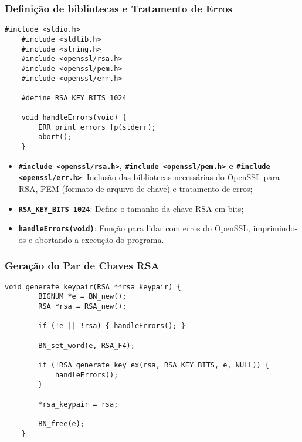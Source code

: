 \documentclass[a4paper,12pt]{article}
\begin{document}
\subsubsection*{Definição de bibliotecas e Tratamento de Erros}
\begin{lstlisting}[style=CStyle]
    #include <stdio.h>
    #include <stdlib.h>
    #include <string.h>
    #include <openssl/rsa.h>
    #include <openssl/pem.h>
    #include <openssl/err.h>

    #define RSA_KEY_BITS 1024

    void handleErrors(void) {
        ERR_print_errors_fp(stderr);
        abort();
    }
\end{lstlisting}

\begin{itemize}
    \item \textbf{\lstinline[style=CStyle]{#include <openssl/rsa.h>}, \lstinline[style=CStyle]{#include <openssl/pem.h>} e \lstinline[style=CStyle]{#include <openssl/err.h>}}: Inclusão das bibliotecas necessárias do OpenSSL para RSA, PEM (formato de arquivo de chave) e tratamento de erros;
    \item \textbf{\lstinline[style=CStyle]{RSA_KEY_BITS 1024}}: Define o tamanho da chave RSA em bits;
    \item \textbf{\lstinline[style=CStyle]{handleErrors(void)}}: Função para lidar com erros do OpenSSL, imprimindo-os e abortando a execução do programa.
\end{itemize}

\subsubsection*{Geração do Par de Chaves RSA}
\begin{lstlisting}[style=CStyle]
    void generate_keypair(RSA **rsa_keypair) {
        BIGNUM *e = BN_new();
        RSA *rsa = RSA_new();

        if (!e || !rsa) { handleErrors(); }

        BN_set_word(e, RSA_F4);

        if (!RSA_generate_key_ex(rsa, RSA_KEY_BITS, e, NULL)) {
            handleErrors();
        }

        *rsa_keypair = rsa;

        BN_free(e);
    }
\end{lstlisting}
\end{document}
